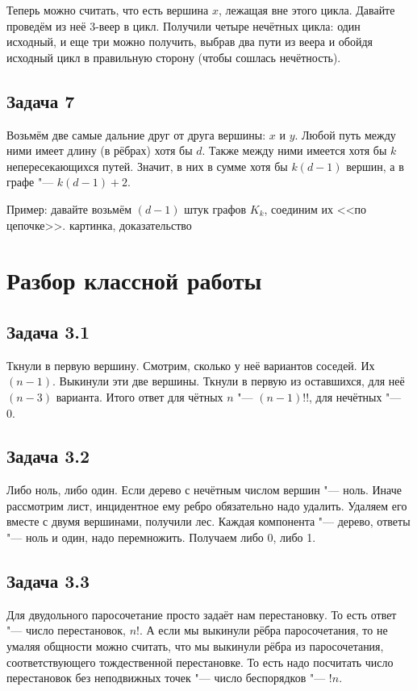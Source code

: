     Теперь можно считать, что есть вершина $x$, лежащая вне этого цикла.
	Давайте проведём из неё 3-веер в цикл.
	Получили четыре нечётных цикла: один исходный, и еще три можно получить, выбрав
	два пути из веера и обойдя исходный цикл в правильную сторону (чтобы сошлась нечётность).
	\begin{center}
	\end{center}

\subsection{Задача 7}
	Возьмём две самые дальние друг от друга вершины: $x$ и $y$.
	Любой путь между ними имеет длину (в рёбрах) хотя бы $d$.
	Также между ними имеется хотя бы $k$ непересекающихся путей.
	Значит, в них в сумме хотя бы $k(d-1)$ вершин, а в графе "--- $k(d-1)+2$.

	Пример: давайте возьмём $(d-1)$ штук графов $K_k$, соединим их <<по цепочке>>.
	\TODO картинка, доказательство

\section{Разбор классной работы}
\subsection{Задача 3.1}
	Ткнули в первую вершину.
	Смотрим, сколько у неё вариантов соседей.
	Их $(n-1)$.
	Выкинули эти две вершины.
	Ткнули в первую из оставшихся, для неё $(n-3)$ варианта.
	Итого ответ для чётных $n$ "--- $(n-1)!!$, для нечётных "--- 0.

\subsection{Задача 3.2}
	Либо ноль, либо один.
	Если дерево с нечётным числом вершин "--- ноль.
	Иначе рассмотрим лист, инцидентное ему ребро обязательно надо удалить.
	Удаляем его вместе с двумя вершинами, получили лес.
	Каждая компонента "--- дерево, ответы "--- ноль и один, надо перемножить.
	Получаем либо 0, либо 1.

\subsection{Задача 3.3}
	Для двудольного паросочетание просто задаёт нам перестановку.
	То есть ответ "--- число перестановок, $n!$.
	А если мы выкинули рёбра паросочетания, то не умаляя общности можно считать,
	что мы выкинули рёбра из паросочетания, соответствующего тождественной перестановке.
	То есть надо посчитать число перестановок без неподвижных точек "--- число беспорядков "--- $!n$.

